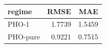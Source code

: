 \begin{tabular}{lrr}
\toprule
regime & RMSE & MAE \\
\midrule
PHO-1 & 1.7739 & 1.5459 \\
PHO-pure & 0.9221 & 0.7515 \\
\bottomrule
\end{tabular}
